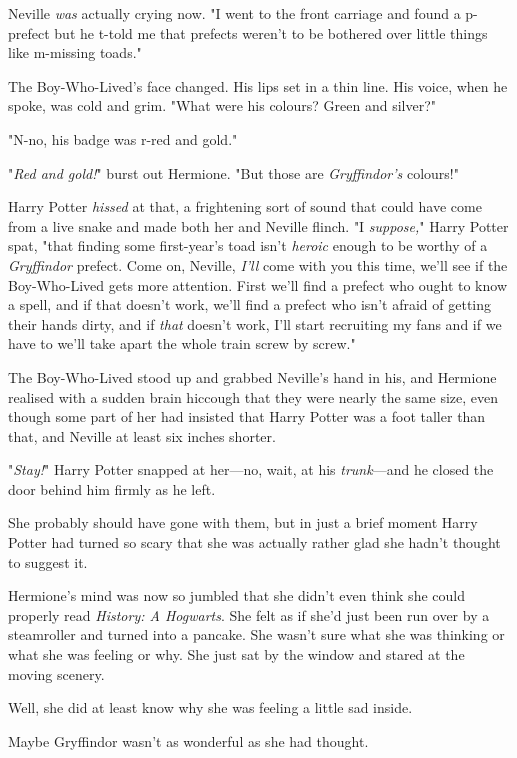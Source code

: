 Neville \emph{was} actually crying now. "I went to the front carriage and found
a p-prefect but he t-told me that prefects weren't to be bothered over little
things like m-missing toads."

The Boy-Who-Lived's face changed. His lips set in a thin line. His voice, when
he spoke, was cold and grim. "What were his colours? Green and silver?"

"N-no, his badge was r-red and gold."

"\emph{Red and gold!}" burst out Hermione. "But those are \emph{Gryffindor's}
colours!"

Harry Potter \emph{hissed} at that, a frightening sort of sound that could have
come from a live snake and made both her and Neville flinch. "I
\emph{suppose,}" Harry Potter spat, "that finding some first-year's toad isn't
\emph{heroic} enough to be worthy of a \emph{Gryffindor} prefect. Come on,
Neville, \emph{I'll} come with you this time, we'll see if the Boy-Who-Lived
gets more attention. First we'll find a prefect who ought to know a spell, and
if that doesn't work, we'll find a prefect who isn't afraid of getting their
hands dirty, and if \emph{that} doesn't work, I'll start recruiting my fans and
if we have to we'll take apart the whole train screw by screw."

The Boy-Who-Lived stood up and grabbed Neville's hand in his, and Hermione
realised with a sudden brain hiccough that they were nearly the same size, even
though some part of her had insisted that Harry Potter was a foot taller than
that, and Neville at least six inches shorter.

"\emph{Stay!}" Harry Potter snapped at her---no, wait, at his
\emph{trunk}---and he closed the door behind him firmly as he left.

She probably should have gone with them, but in just a brief moment Harry
Potter had turned so scary that she was actually rather glad she hadn't thought
to suggest it.

Hermione's mind was now so jumbled that she didn't even think she could
properly read \emph{History: A Hogwarts}. She felt as if she'd just been run over by
a steamroller and turned into a pancake. She wasn't sure what she was thinking
or what she was feeling or why. She just sat by the window and stared at the
moving scenery.

Well, she did at least know why she was feeling a little sad inside.

Maybe Gryffindor wasn't as wonderful as she had thought.
